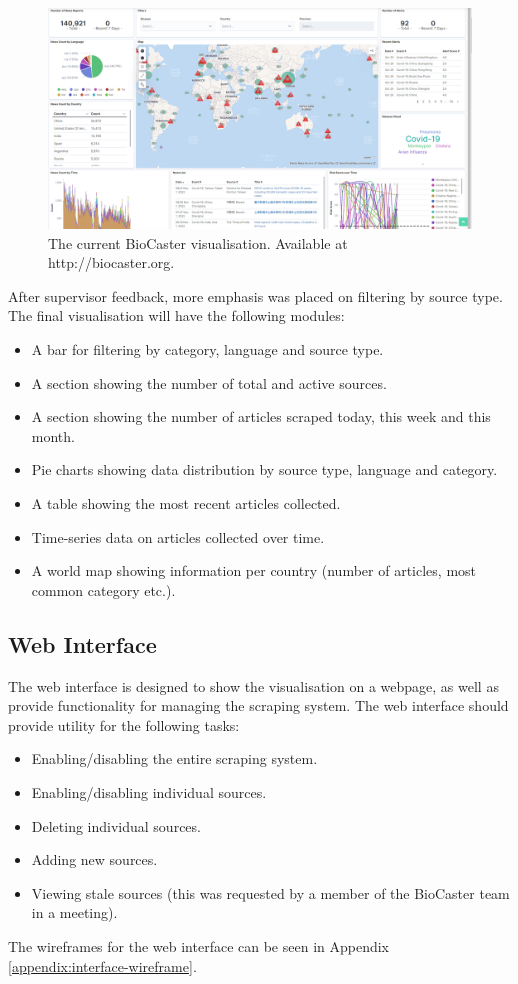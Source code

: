 \documentclass{l4proj}
\begin{document}
 \begin{figure}[h]
\centering
\includegraphics[width=\textwidth]{images/biocaster_interface.png}
\caption{The current BioCaster visualisation. Available at http://biocaster.org.}
\label{fig:biocaster-visualisation}
\end{figure}


After supervisor feedback, more emphasis was placed on filtering by source type. The final visualisation will have the following modules:
\begin{itemize}
    \item A bar for filtering by category, language and source type.
    \item A section showing the number of total and active sources.
    \item A section showing the number of articles scraped today, this week and this month.
    \item Pie charts showing data distribution by source type, language and category.
    \item A table showing the most recent articles collected.
    \item Time-series data on articles collected over time.
    \item A world map showing information per country (number of articles, most common category etc.).
\end{itemize}

\subsection{Web Interface}
The web interface is designed to show the visualisation on a webpage, as well as provide functionality for managing the scraping system. The web interface should provide utility for the following tasks:
\begin{itemize}
    \item Enabling/disabling the entire scraping system.
    \item Enabling/disabling individual sources.
    \item Deleting individual sources.
    \item Adding new sources.
    \item Viewing stale sources (this was requested by a member of the BioCaster team in a meeting).
\end{itemize}
The wireframes for the web interface can be seen in Appendix \ref{appendix:interface-wireframe}.
\end{document}

